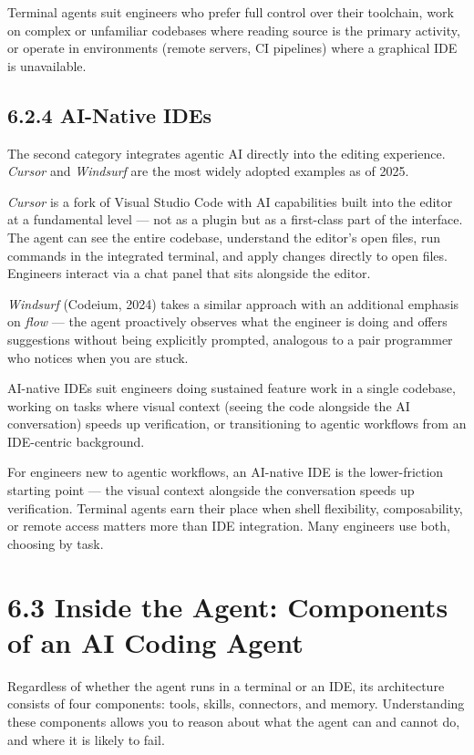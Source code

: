 \documentclass[11pt,a4paper]{book}
\begin{document}
Terminal agents suit engineers who prefer full control over their toolchain, work on complex or unfamiliar codebases where reading source is the primary activity, or operate in environments (remote servers, CI pipelines) where a graphical IDE is unavailable.

\subsection{6.2.4 AI-Native IDEs}

The second category integrates agentic AI directly into the editing experience. \textit{Cursor} and \textit{Windsurf} are the most widely adopted examples as of 2025.

\textit{Cursor} is a fork of Visual Studio Code with AI capabilities built into the editor at a fundamental level --- not as a plugin but as a first-class part of the interface. The agent can see the entire codebase, understand the editor's open files, run commands in the integrated terminal, and apply changes directly to open files. Engineers interact via a chat panel that sits alongside the editor.

\textit{Windsurf} (Codeium, 2024) takes a similar approach with an additional emphasis on \textit{flow} --- the agent proactively observes what the engineer is doing and offers suggestions without being explicitly prompted, analogous to a pair programmer who notices when you are stuck.

AI-native IDEs suit engineers doing sustained feature work in a single codebase, working on tasks where visual context (seeing the code alongside the AI conversation) speeds up verification, or transitioning to agentic workflows from an IDE-centric background.

For engineers new to agentic workflows, an AI-native IDE is the lower-friction starting point --- the visual context alongside the conversation speeds up verification. Terminal agents earn their place when shell flexibility, composability, or remote access matters more than IDE integration. Many engineers use both, choosing by task.

\medskip

\section{6.3 Inside the Agent: Components of an AI Coding Agent}

Regardless of whether the agent runs in a terminal or an IDE, its architecture consists of four components: tools, skills, connectors, and memory. Understanding these components allows you to reason about what the agent can and cannot do, and where it is likely to fail.
\end{document}
